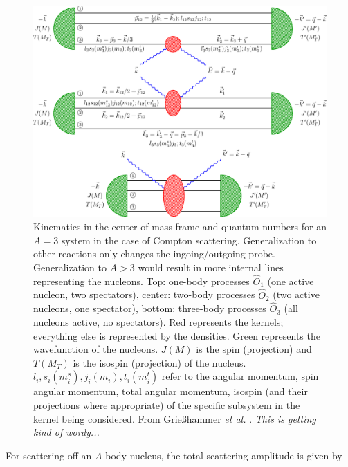 \documentclass[a4paper,11pt]{article}
\newcommand{\etal}{\textit{et al.}}
\newcommand\bv[1]{\vec{#1}}
\newcommand{\ques}[1]{\color{red}\textit{ #1 }\color{black}}
\begin{document}
\begin{figure}[h]
  \begin{center}
    \includegraphics[scale=0.7]{kinematics3He.pdf}
    \caption{Kinematics in the center of mass frame and quantum
      numbers for an $A=3$ system in the case of Compton scattering.
      Generalization to other reactions only changes the
      ingoing/outgoing probe. Generalization to $A>3$ would result in more internal lines
      representing the nucleons.
      Top: one-body processes $\hat{O}_1$ (one active nucleon, two spectators),
      center: two-body
      processes $\hat{O}_{2}$ (two active nucleons, one spectator), bottom: three-body processes
      $\hat{O}_{3}$ (all nucleons active, no spectators). Red represents the kernels; 
      everything else is represented by the densities.
      Green represents the wavefunction of the nucleons.
      $J(M)$ is the spin (projection) and  $T(M_T)$ is the isospin (projection) of the nucleus. 
      $l_i,s_i(m_i^s),j_i(m_i), t_i(m_i^t)$  refer to the angular momentum, spin angular momentum, total angular momentum, isospin (and their projections where appropriate) of the specific subsystem in the kernel being considered.
      From Grie{\ss}hammer \etal
    \cite{hammer2020}.
    \ques{This is getting kind of wordy...}
  }
    \label{fig:onetwobod}
  \end{center}
\end{figure}
For scattering off an $A$-body nucleus, the total scattering
amplitude is given by 
\end{document}

